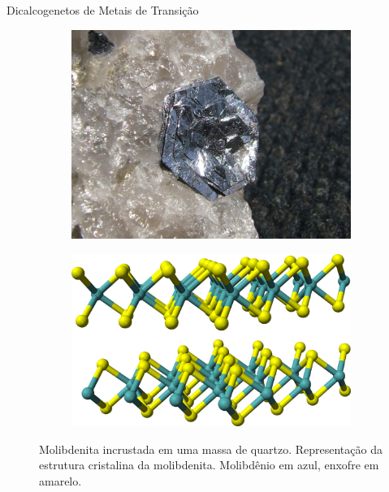 \begin{frame}{Dicalcogenetos de Metais de Transição}
  \begin{figure}[ht]
    \begin{subfigure}{0.49\textwidth}
      \centering
      \includegraphics[width=1.0\linewidth]{imagens/molybdenite.jpeg}
      \caption{}
      \label{fig:mos2a}
    \end{subfigure}
    \begin{subfigure}{0.49\textwidth}
      \centering
      \includegraphics[width=1.0\linewidth]{imagens/molybdenite_crystal.png}
      \caption{}
      \label{fig:mos2b}
    \end{subfigure}
    \caption{
       Molibdenita incrustada em uma massa de quartzo.
       Representação da estrutura cristalina da molibdenita. Molibdênio em azul, enxofre em amarelo.
    }
    \label{fig:mos2}
  \end{figure}
\end{frame}

